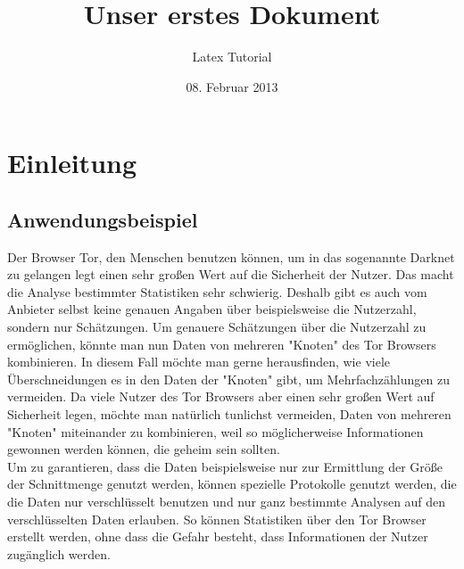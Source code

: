 \documentclass[a4paper,10pt]{scrartcl}
\title{Unser erstes Dokument}
\author{Latex Tutorial}
\date{08. Februar 2013}
\begin{document}
\maketitle
\tableofcontents

\newpage


\section{Einleitung}

\subsection{Anwendungsbeispiel}
Der Browser Tor, den Menschen benutzen können, um in das sogenannte Darknet zu gelangen legt einen sehr großen Wert auf die Sicherheit der Nutzer. Das macht die Analyse bestimmter Statistiken sehr schwierig. Deshalb gibt es auch vom Anbieter selbst keine genauen Angaben über beispielsweise die Nutzerzahl, sondern nur Schätzungen. Um genauere Schätzungen über die Nutzerzahl zu ermöglichen, könnte man nun Daten von mehreren "Knoten" des Tor Browsers kombinieren. In diesem Fall möchte man gerne herausfinden, wie viele Überschneidungen es in den Daten der "Knoten" gibt, um Mehrfachzählungen zu vermeiden. Da viele Nutzer des Tor Browsers aber einen sehr großen Wert auf Sicherheit legen, möchte man natürlich tunlichst vermeiden, Daten von mehreren "Knoten" miteinander zu kombinieren, weil so möglicherweise Informationen gewonnen werden können, die geheim sein sollten.\\
Um zu garantieren, dass die Daten beispielsweise nur zur Ermittlung der Größe der Schnittmenge genutzt werden, können spezielle Protokolle genutzt werden, die die Daten nur verschlüsselt benutzen und nur ganz bestimmte  Analysen auf den verschlüsselten Daten erlauben. So können Statistiken über den Tor Browser erstellt werden, ohne dass die Gefahr besteht, dass Informationen der Nutzer zugänglich werden.
\end{document}
